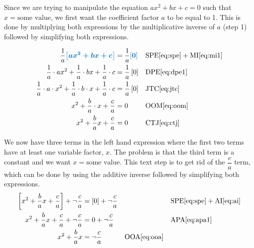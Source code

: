 \documentclass[20150903-160354-rs2.2-MarksMathNotebook.tex]{subfiles}
\begin{document}
Since we are trying to manipulate the equation  $ax^2+bx+c=0$ such that $x=\text{some value}$, we first want the coefficient factor $a$ to be equal to 1.  This is done by multiplying both expressions by the multiplicative inverse of $a$ (step 1) followed by simplifying both expressions.


\begin{align*}
\dfrac{1}{a} \farg{ax^2 + bx +c} & = \dfrac{1}{a} \farg{0} && \text{SPE} \eqref{eq:spe} + \text{MI} \eqref{eq:mi1} \\
\dfrac{1}{a} \cdot ax^2 + \dfrac{1}{a} \cdot bx + \dfrac{1}{a} \cdot c  & = \dfrac{1}{a} \left[ 0\right] && \text{DPE} \eqref{eq:dpe1} \\
\dfrac{1}{a} \cdot a \cdot x^2 + \dfrac{1}{a} \cdot b \cdot x + \dfrac{1}{a} \cdot c  & = \dfrac{1}{a} \left[ 0\right] && \text{JTC} \eqref{eq:jtc} \\
x^2 + \dfrac{b}{a} \cdot x + \dfrac{c}{a} & = 0 && \text{OOM} \eqref{eq:oom} \\
x^2 +\dfrac{b}{a}x + \dfrac{c}{a}  & = 0 && \text{CTJ} \eqref{eq:ctj}
\end{align*}

We now have three terms in the left hand expression where the first two terms have at least one variable factor, $x$.  The problem is that the third term is a constant and we want $x=\text{some value}$.  This text step is to get rid of the $\dfrac{c}{a}$ term, which can be done by using the additive inverse followed by simplifying both expressions.\\

\begin{align*}
\left[x^2 +\dfrac{b}{a}x + \dfrac{c}{a} \right]  + \neg \dfrac{c}{a}  & = \left[ 0 \right]   + \neg \dfrac{c}{a} && && \text{SPE} \eqref{eq:spe} + \text{AI} \eqref{eq:ai} \\
x^2 +\dfrac{b}{a}x + \dfrac{c}{a} + \neg \dfrac{c}{a}  & = 0  + \neg \dfrac{c}{a} && && \text{APA} \eqref{eq:apa1} \\
x^2 +\dfrac{b}{a}x  & = \neg \dfrac{c}{a} && \text{OOA} \eqref{eq:ooa} \\
\end{align*}
\end{document}
